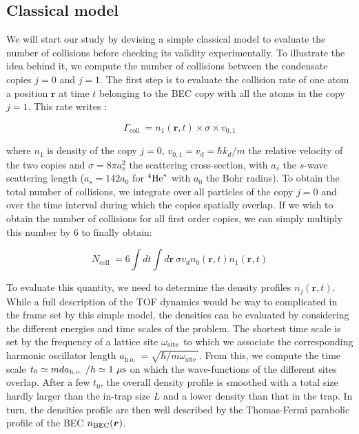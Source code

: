 \subsection{Classical model}

We will start our study by devising a simple classical model to evaluate the number of collisions before checking its validity experimentally. To illustrate the idea behind it, we compute the number of collisions between the condensate copies $j=0$ and $j=1$. The first step is to evaluate the collision rate of one atom a position $\bm{r}$ at time $t$ belonging to the BEC copy with all the atoms in the copy $j=1$. This rate writes \cite{chikkatur2000suppression,perrin:tel-00244641}:

\begin{equation}
    \Gamma_{\text {coll }}=n_{1}(\bm{r}, t) \times \sigma \times v_{0,1}
\end{equation}

\noindent where $n_1$ is density of the copy $j=0$, $v_{0,1}=v_d=\hbar k_d/m$ the relative velocity of the two copies and $\sigma= 8 \pi a_s^2$ the scattering cross-section, with $a_s$ the $s$-wave scattering length ($a_s = 142 a_0$ for $^4\mathrm{He}^*$ with $a_0$ the Bohr radius). To obtain the total number of collisions, we integrate over all particles of the copy $j=0$ and over the time interval during which the copies spatially overlap. If we wish to obtain the number of collisions for all first order copies, we can simply multiply this number by $6$ to finally obtain:

\begin{equation}
    N_{\text {coll }}=6 \int d t \int d \bm{r} \ \sigma v_{d} n_{0}(\bm{r}, t) n_{1}(\bm{r}, t)
    \label{eq:coll_model_general}
\end{equation}

To evaluate this quantity, we need to determine the density profiles $n_{j}(\bm{r}, t)$. While a full description of the TOF dynamics would be way to complicated in the frame set by this simple model, the densities can be evaluated by considering the different energies and time scales of the problem. The shortest time scale is set by the frequency of a lattice site $\omega_{\rm{site}}$ to which we associate the corresponding harmonic oscillator length $a_{\text {h.o. }}=\sqrt{\hbar / m \omega_{\text {site }}}$. From this, we compute the time scale $t_0 \simeq m d a_{\text {h.o. }} /h \simeq 1 \ \mu \rm{s}$ on which the wave-functions of the different sites overlap. After a few $t_0$, the overall density profile is smoothed with a total size hardly larger than the in-trap size $L$ and a lower density than that in the trap. In turn, the densities profile are then well described by the Thomas-Fermi parabolic profile of the BEC $n_{\rm{BEC}}(\bm{r})$.

